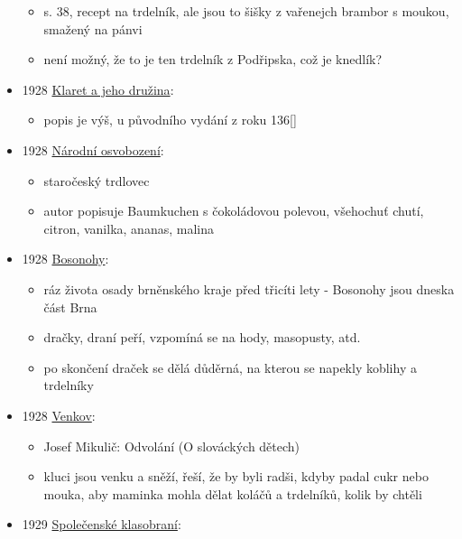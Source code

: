 \begin{itemize}
  \begin{itemize}
  \tightlist
  \item
    s. 38, recept na trdelník, ale jsou to šišky z vařenejch brambor s
    moukou, smažený na pánvi
  \item
    není možný, že to je ten trdelník z Podřipska, což je knedlík?
  \end{itemize}
\item
  1928
  \href{https://sources.cms.flu.cas.cz/src/index.php?s=v&bookid=833&page=3}{Klaret
  a jeho družina}:

  \begin{itemize}
  \tightlist
  \item
    popis je výš, u původního vydání z roku 136{[}{]}
  \end{itemize}
\item
  1928
  \href{https://ceskadigitalniknihovna.cz/view/uuid:f80a63e0-611a-11e1-acfb-0013d398622b?page=uuid\%3Ada4abcb0-9dd7-11e7-a093-005056825209&fulltext=trdlovec&source=nkp}{Národní
  osvobození}:

  \begin{itemize}
  \tightlist
  \item
    staročeský trdlovec
  \item
    autor popisuje Baumkuchen s čokoládovou polevou, všehochuť chutí,
    citron, vanilka, ananas, malina
  \end{itemize}
\item
  1928
  \href{https://ceskadigitalniknihovna.cz/view/uuid:d9b0f410-125b-11ed-8635-005056827e52?page=uuid\%3A82be2751-0e47-4147-a2f9-395b5608b5ce&fulltext=trdeln\%C3\%ADk\%20OR\%20trdeln\%C3\%ADky\%20OR\%20trdeln\%C3\%ADk\%C5\%AF&source=mzk}{Bosonohy}:

  \begin{itemize}
  \tightlist
  \item
    ráz života osady brněnského kraje před třicíti lety - Bosonohy jsou
    dneska část Brna
  \item
    dračky, draní peří, vzpomíná se na hody, masopusty, atd.
  \item
    po skončení draček se dělá důděrná, na kterou se napekly koblihy a
    trdelníky
  \end{itemize}
\item
  1928
  \href{https://ceskadigitalniknihovna.cz/uuid/uuid:25f83680-128e-11e8-8ee4-005056825209}{Venkov}:

  \begin{itemize}
  \tightlist
  \item
    Josef Mikulič: Odvolání (O slováckých dětech)
  \item
    kluci jsou venku a sněží, řeší, že by byli radši, kdyby padal cukr
    nebo mouka, aby maminka mohla dělat koláčů a trdelníků, kolik by
    chtěli
  \end{itemize}
\item
  1929
  \href{https://ceskadigitalniknihovna.cz/view/uuid:8eac0a2b-3229-4774-bc7b-59842402b9e4?page=uuid\%3Abd127f65-068f-11ee-8565-00155d01210b&source=svkhk}{Společenské
  klasobraní}:


\end{itemize}
